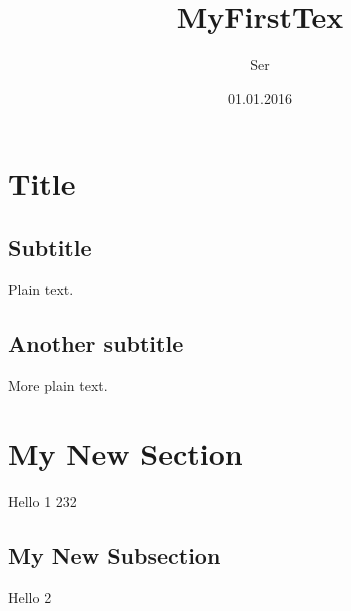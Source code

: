 \documentclass{article}
\begin{document}
\title{MyFirstTex}
\author{Ser}
\date{01.01.2016}
\maketitle

\section{Title}

\subsection{Subtitle}

Plain text.

\subsection{Another subtitle}

More plain text.

\section{My New Section}
Hello 1 232
\subsection{My New Subsection}
Hello 2
\end{document}

